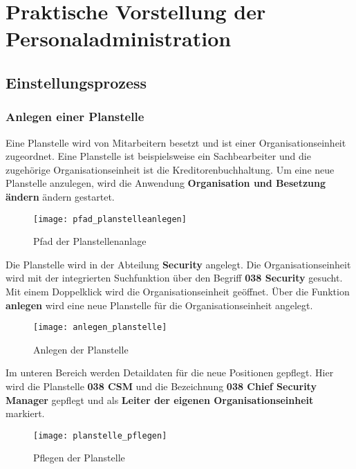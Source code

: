 

\section{Praktische Vorstellung der Personaladministration}
\label{sec:praktischevorstellungderpersonaladministration}

\subsection{Einstellungsprozess}
\subsubsection{Anlegen einer Planstelle}
Eine Planstelle wird von Mitarbeitern besetzt und ist einer Organisationseinheit zugeordnet. Eine Planstelle ist beispielsweise ein Sachbearbeiter und die zugehörige Organisationseinheit ist die Kreditorenbuchhaltung. Um eine neue Planstelle anzulegen, wird die Anwendung \textbf{Organisation und Besetzung ändern} ändern gestartet.

\begin{figure}[H]
	\centering
	\texttt{[image: pfad\_planstelleanlegen]}
	\caption{Pfad der Planstellenanlage}
	\label{fig:pfad_planstelleanlegen}
\end{figure}

Die Planstelle wird in der Abteilung \textbf{Security} angelegt. Die Organisationseinheit wird mit der integrierten Suchfunktion über den Begriff \textbf{038 Security} gesucht. Mit einem Doppelklick wird die Organisationseinheit geöffnet. Über die Funktion \textbf{anlegen} wird eine neue Planstelle für die Organisationseinheit angelegt.

\begin{figure}[H]
	\centering
	\texttt{[image: anlegen\_planstelle]}
	\caption{Anlegen der Planstelle}
	\label{fig:anlegen_planstelle}
\end{figure}

Im unteren Bereich werden Detaildaten für die neue Positionen gepflegt. Hier wird die Planstelle \textbf{038 CSM} und die Bezeichnung \textbf{038 Chief Security Manager} gepflegt und als \textbf{Leiter der eigenen Organisationseinheit} markiert.

\begin{figure}[H]
	\centering
	\texttt{[image: planstelle\_pflegen]}
	\caption{Pflegen der Planstelle}
	\label{fig:planstelle_pflegen}
\end{figure}

